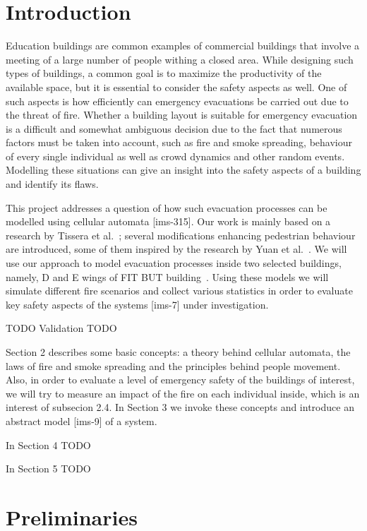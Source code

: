 \section{Introduction}
Education buildings are common examples of commercial buildings that involve a
meeting of a large number of people withing a closed area.
While designing such types of buildings, a common goal is to maximize the
productivity of the available space, but it is essential to consider the
safety aspects as well.
One of such aspects is how efficiently can emergency evacuations be carried out
due to the threat of fire.
Whether a building layout is suitable for emergency evacuation is a difficult
and somewhat ambiguous decision due to the fact that numerous factors must be
taken into account, such as fire and smoke spreading, behaviour of every single
individual as well as crowd dynamics and other random events.
Modelling these situations can give an insight into the safety aspects of a
building and identify its flaws.

This project addresses a question of how such evacuation processes can be
modelled using cellular automata [ims-315].
Our work is mainly based on a research by Tissera et al.~\cite{Tissera1};
several modifications enhancing pedestrian behaviour are introduced, some of
them inspired by the research by Yuan et al.~\cite{Yuan}.
We will use our approach to model evacuation processes inside two selected
buildings, namely, D and E wings of FIT BUT building~\cite{FIT}.
Using these models we will simulate different fire scenarios and collect
various statistics in order to evaluate key safety aspects of the
systems [ims-7] under investigation.

{TODO Validation TODO}

Section 2 describes some basic concepts: a theory behind cellular automata,
the laws of fire and smoke spreading and the principles behind people movement.
Also, in order to evaluate a level of emergency safety of the buildings of
interest, we will try to measure an impact of the fire on each individual
inside, which is an interest of subsecion 2.4.
In Section 3 we invoke these concepts and introduce an abstract model [ims-9]
of a system.

{In Section 4 TODO}

{In Section 5 TODO}

\section{Preliminaries}
